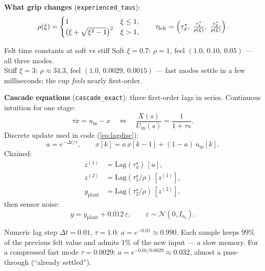 \documentclass[11pt,a4paper]{article}
\newcommand{\dt}{\Delta t}
\begin{document}
\textbf{What grip changes} (\texttt{experienced\_taus}):
\begin{equation}
\rho(\xi)=\begin{cases}
1 & \xi\le 1,\\
\bigl(\xi+\sqrt{\xi^2-1}\bigr)^2 & \xi>1,
\end{cases}
\qquad
\tau_{\mathrm{felt}}=\Bigl(\tau_d^\star,\;
\tfrac{\tau_1^\star}{\rho(\xi)},\;
\tfrac{\tau_2^\star}{\rho(\xi)}\Bigr).
\label{eq:l4felt}
\end{equation}

\begin{examplebox}{Felt time constants at soft vs stiff}
Soft $\xi=0.7$: $\rho=1$, feel $(1.0,\,0.10,\,0.05)$ --- all three modes.\\
Stiff $\xi=3$: $\rho\approx34.3$, feel $(1.0,\,0.0029,\,0.0015)$ --- fast
modes settle in a few milliseconds; the cup \emph{feels} nearly first-order.
\end{examplebox}

\textbf{Cascade equations} (\texttt{cascade\_exact}): three first-order lags
in series.  Continuous intuition for one stage:
\begin{equation}
\tau\dot x = u_{\mathrm{in}}-x
\quad\Leftrightarrow\quad
\frac{X(s)}{U_{\mathrm{in}}(s)}=\frac{1}{1+\tau s}.
\end{equation}
Discrete update used in code (\eqref{eq:lagdisc}):
\begin{equation}
a=e^{-\dt/\tau},\qquad
x[k]=a\,x[k-1]+(1-a)\,u_{\mathrm{in}}[k].
\label{eq:l4lag}
\end{equation}
Chained:
\begin{align}
z^{(1)} &= \mathrm{Lag}(\tau_d^\star)\,[u], \nonumber\\
z^{(2)} &= \mathrm{Lag}(\tau_1^\star/\rho)\,[z^{(1)}], \nonumber\\
y_{\mathrm{plant}} &= \mathrm{Lag}(\tau_2^\star/\rho)\,[z^{(2)}],
\label{eq:l4cascade}
\end{align}
then sensor noise:
\begin{equation}
y = y_{\mathrm{plant}} + 0.012\,\varepsilon,
\qquad \varepsilon\sim\mathcal N(0,I_{n_t}).
\label{eq:l4y}
\end{equation}

\begin{examplebox}{Numeric lag step}
$\dt=0.01$, $\tau=1.0$: $a=e^{-0.01}\approx0.990$.  Each sample keeps 99\%
of the previous felt value and admits 1\% of the new input --- a slow
memory.  For a compressed fast mode $\tau=0.0029$: $a=e^{-0.01/0.0029}\approx0.032$,
almost a pass-through (``already settled'').
\end{examplebox}
\end{document}
